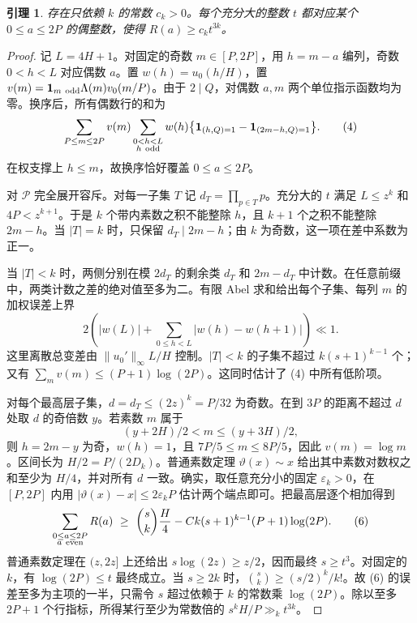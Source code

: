 \documentclass[UTF8,a4paper,11pt,fontset=windows]{ctexart}
\newtheorem{lemma}[theorem]{引理}
\newcommand{\Lam}{\Lambda}
\newcommand{\ind}{\mathbf 1}
\begin{document}
\begin{lemma}\label{le:sieve}
存在只依赖 \(k\) 的常数 \(c_k>0\)。每个充分大的整数 \(t\) 都对应某个 \(0\le a\le2P\) 的偶整数，使得 \(R(a)\ge c_k t^{3k}\)。
\end{lemma}
\begin{proof}
记 \(L=4H+1\)。对固定的奇数 \(m\in[P,2P]\)，用 \(h=m-a\) 编列，奇数 \(0<h<L\) 对应偶数 \(a\)。置 \(w(h)=u_0(h/H)\)，置
\(v(m)=\ind_{m\ {\rm odd}}\Lam(m)v_0(m/P)\)。由于 \(2\mid Q\)，对偶数 \(a,m\) 两个单位指示函数均为零。换序后，所有偶数行的和为
\[
 \sum_{P\le m\le2P}v(m)\sum_{\substack{0<h<L\\h\ {\rm odd}}}w(h)
       \big\{\ind_{(h,Q)=1}-\ind_{(2m-h,Q)=1}\big\}.          \tag{4}
\]
在权支撑上 \(h\le m\)，故换序恰好覆盖 \(0\le a\le2P\)。

对 \(\mathcal P\) 完全展开容斥。对每一子集 \(T\) 记 \(d_T=\prod_{p\in T}p\)。充分大的 \(t\) 满足 \(L\le z^k\) 和 \(4P<z^{k+1}\)。于是 \(k\) 个带内素数之积不能整除 \(h\)，且 \(k+1\) 个之积不能整除 \(2m-h\)。当 \(|T|=k\) 时，只保留 \(d_T\mid 2m-h\)；由 \(k\) 为奇数，这一项在差中系数为正一。

当 \(|T|<k\) 时，两侧分别在模 \(2d_T\) 的剩余类 \(d_T\) 和 \(2m-d_T\) 中计数。在任意前缀中，两类计数之差的绝对值至多为二。有限 Abel 求和给出每个子集、每列 \(m\) 的加权误差上界
\[
   2\left(|w(L)|+\sum_{0\le h<L}|w(h)-w(h+1)|\right)\ll 1. \tag{5}
\]
这里离散总变差由 \(\|u_0'\|_\infty L/H\) 控制。\(|T|<k\) 的子集不超过 \(k(s+1)^{k-1}\) 个；又有 \(\sum_m v(m)\le(P+1)\log(2P)\)。这同时估计了 (4) 中所有低阶项。

对每个最高层子集，\(d=d_T\le(2z)^k=P/32\) 为奇数。在到 \(3P\) 的距离不超过 \(d\) 处取 \(d\) 的奇倍数 \(y\)。若素数 \(m\) 属于
\[
              (y+2H)/2<m\le(y+3H)/2 ,
\]
则 \(h=2m-y\) 为奇，\(w(h)=1\)，且 \(7P/5\le m\le8P/5\)，因此 \(v(m)=\log m\)。区间长为 \(H/2=P/(2D_k)\)。普通素数定理 \(\vartheta(x)\sim x\) 给出其中素数对数权之和至少为 \(H/4\)，并对所有 \(d\) 一致。确实，取任意充分小的固定 \(\varepsilon_k>0\)，在 \([P,2P]\) 内用 \(|\vartheta(x)-x|\le2\varepsilon_k P\) 估计两个端点即可。把最高层逐个相加得到
\[
 \sum_{\substack{0\le a\le2P\\ a\ {\rm even}}}R(a)
 \ \ge\ \binom{s}{k}\frac H4-C k(s+1)^{k-1}(P+1)\log(2P).  \tag{6}
\]
普通素数定理在 \((z,2z]\) 上还给出 \(s\log(2z)\ge z/2\)，因而最终 \(s\ge t^3\)。对固定的 \(k\)，有 \(\log(2P)\le t\) 最终成立。当 \(s\ge2k\) 时，\(\binom{s}{k}\ge(s/2)^k/k!\)。故 (6) 的误差至多为主项的一半，只需令 \(s\) 超过依赖于 \(k\) 的常数乘 \(\log(2P)\)。除以至多 \(2P+1\) 个行指标，所得某行至少为常数倍的 \(s^kH/P\gg_k t^{3k}\)。
\end{proof}
\end{document}
